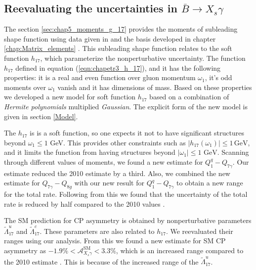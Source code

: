 \subsection{Reevaluating the uncertainties in $\bar{B}\to X_s\gamma$ }
The section \ref{sec:chap5_moments_g_17} provides the moments of subleading shape function using data given in \cite{Gambino:2016jkc} and the basis developed in chapter \ref{chap:Matrix_elements} \cite{Gunawardana:2017zix}. This subleading shape function relates to the soft function $h_{17}$, which parameterize the nonperturbative uncertainty. The function $h_{17}$ defined in equation (\ref{eqn:chapetr3_h_17}), and it has the following properties: it is a real and even function over gluon momentum $\omega_1$, it's odd moments over $\omega_1$ vanish and it has dimensions of mass. Based on these properties we developed a new model for soft function $h_{17}$ based on a combination of \textit{Hermite polynomials} multiplied \textit{Gaussian}. The explicit form of the new model is given in section \ref{Model}.\par
The $h_{17}$ is is a soft function, so one expects it not to have significant structures beyond $\omega_1\leq 1$ GeV. This provides other constraints such as $\left|h_{17}\left(\omega_{1}\right)\right| \leq 1\mathrm{\, GeV}$, and it limits the function from having structures beyond $|\omega_1|\leq 1\text{ GeV}$. Scanning through different values of moments, we found a new estimate for $Q_1^q-Q_{7\gamma}$. Our estimate reduced the 2010 estimate \cite{Benzke:2010js} by a third. Also, we combined the new estimate for $Q_{7\gamma}-Q_{8g}$ with our new result for $Q_1^q-Q_{7\gamma}$ to obtain a new range for the total rate. Following from this we found that the uncertainty of the total rate is reduced by half compared to the 2010 values \cite{Benzke:2010js}.\par
The SM prediction for CP asymmetry is obtained by nonperturbative parameters $\tilde{\Lambda}_{17}^u$ and $\tilde{\Lambda}_{17}^c$. These parameters are also related to $h_{17}$. We reevaluated their ranges using our analysis. From this we found a new estimate for SM CP asymmetry as $-1.9 \%<\mathcal{A}_{X_{s} \gamma}^{\mathrm{SM}}<3.3 \%$, which is an increased range compared to the 2010 estimate \cite{Benzke:2010tq}. This is because of the increased range of the $\tilde{\Lambda}_{17}^u$.\par

